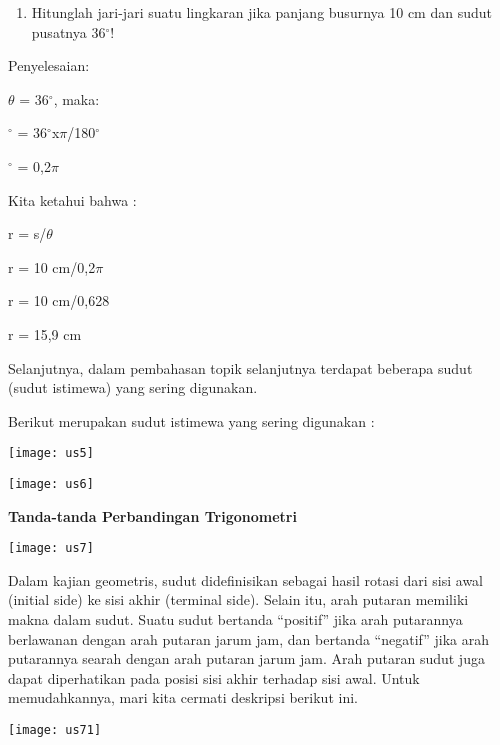 \documentclass[11pt,fleqn]{book} %
\begin{document}
\begin{myEnumerate}
\begin{itemize}
\noindent 

\begin{enumerate}
\item  Hitunglah jari-jari suatu lingkaran jika panjang busurnya 10 cm dan sudut pusatnya 36${}^\circ$!
\end{enumerate}

\noindent 

\noindent Penyelesaian:

\noindent $\theta$ = 36$\mathrm{{}^\circ}$, maka:

$\mathrm{{}^\circ}$ = 36$\mathrm{{}^\circ}$x$\pi$/180$\mathrm{{}^\circ}$

$\mathrm{{}^\circ}$ = 0,2$\pi$

\noindent Kita ketahui bahwa :

\noindent r = s/$\theta$

\noindent r = 10 cm/0,2$\pi$

\noindent r = 10 cm/0,628

\noindent r = 15,9 cm

\noindent 

\noindent 

Selanjutnya, dalam pembahasan topik selanjutnya terdapat beberapa sudut (sudut istimewa) yang sering digunakan.

Berikut merupakan sudut istimewa yang sering digunakan :

\texttt{[image: us5]}

\texttt{[image: us6]}



\textbf{}

\textbf{Tanda-tanda Perbandingan Trigonometri }

\texttt{[image: us7]}

Dalam kajian geometris, sudut didefinisikan sebagai hasil rotasi dari sisi awal (initial side) ke sisi akhir (terminal side).  Selain itu, arah putaran memiliki makna dalam sudut. Suatu sudut bertanda ``positif'' jika arah putarannya berlawanan dengan arah putaran jarum jam, dan bertanda ``negatif'' jika arah putarannya searah dengan arah putaran jarum jam. Arah putaran sudut juga dapat diperhatikan pada posisi sisi akhir terhadap sisi awal. Untuk memudahkannya, mari kita cermati deskripsi berikut ini.

\texttt{[image: us71]}


\end{itemize}
\end{myEnumerate}
\end{document}
